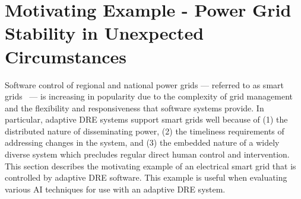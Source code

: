 \documentclass[conference]{IEEEtran}
\begin{document}
%


\section{Motivating Example - Power Grid Stability in Unexpected Circumstances}
\label{example}

Software control of regional and national power grids --- referred to as smart grids~\cite{Ramchurn:12}\cite{Venayagamoorthy:09} --- is increasing in popularity due to the complexity of grid management and the flexibility and responsiveness that software systems provide. In particular, adaptive DRE systems support smart grids well because of (1) the distributed nature of disseminating power, (2) the timeliness requirements of addressing changes in the system, and (3) the embedded nature of a widely diverse system which precludes regular direct human control and intervention. This section describes the motivating example of an electrical smart grid that is controlled by adaptive DRE software. This example is useful when evaluating various AI techniques for use with an adaptive DRE system.
\end{document}
